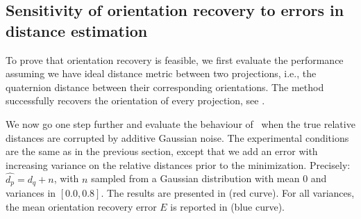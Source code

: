 \subsection{Sensitivity of orientation recovery to errors in distance estimation}\label{sec:results:orientation-recovery:sensitivity}


To prove that orientation recovery is feasible, we first evaluate the performance assuming we have ideal distance metric between two projections, i.e., the quaternion distance between their corresponding orientations.
The method successfully recovers the orientation of every projection, see .

We now go one step further and evaluate the behaviour of~ when the true relative distances are corrupted by additive Gaussian noise.
The experimental conditions are the same as in the previous section, except that we add an error with increasing variance on the relative distances prior to the minimization.
Precisely: $\widehat{d_p} = d_q + n$, with $n$ sampled from a Gaussian distribution with mean 0 and variances in $[0.0, 0.8]$.
The results are presented in  (red curve).
For all variances, the mean orientation recovery error $E$ is reported in  (blue curve).

